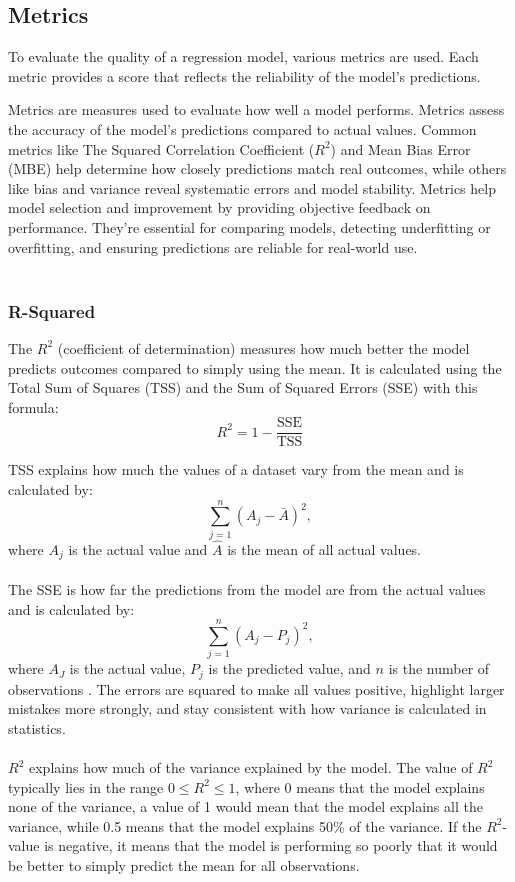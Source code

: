 \subsection{Metrics}
To evaluate the quality of a regression model, various metrics are used. Each metric provides a score that reflects the reliability of the model's predictions.

Metrics are measures used to evaluate how well a model performs. Metrics assess the accuracy of the model’s predictions compared to actual values. Common metrics like The Squared Correlation Coefficient ($R^{2}$) and Mean Bias Error (MBE) help determine how closely predictions match real outcomes, while others like bias and variance reveal systematic errors and model stability. Metrics help model selection and improvement by providing objective feedback on performance. They’re essential for comparing models, detecting underfitting or overfitting, and ensuring predictions are reliable for real-world use.
\\\\

\subsubsection{R-Squared}
The $R^2$ (coefficient of determination) measures how much better the model predicts outcomes compared to simply using the mean. It is calculated using the Total Sum of Squares (TSS) and the Sum of Squared Errors (SSE) with this formula: 
\begin{equation}
R^2=1-\frac{\text{SSE}}{\text{TSS}}
\end{equation}

TSS explains how much the values of a dataset vary from the mean and is calculated by: 
\begin{equation}
\sum_{j=1}^{n}(A_j - \bar{A})^2,
\end{equation}
where $A_j$ is the actual value and $\hat{A}$ is the mean of all actual values.
\\\\

\noindent The SSE is how far the predictions from the model are from the actual values and is calculated by:
\begin{equation}
	\sum_{j=1}^{n}(A_j - P_j)^2,
\end{equation}
where $A_J$ is the actual value, $P_j$ is the predicted value, and $n$ is the number of observations \cite{metrics}. The errors are squared to make all values positive, highlight larger mistakes more strongly, and stay consistent with how variance is calculated in statistics.
\\\\
$R^2$ explains how much of the variance explained by the model. The value of $R^2$ typically lies in the range $0 \leq R^2 \leq 1$, where 0 means that the model explains none of the variance, a value of 1 would mean that the model explains all the variance, while 0.5 means that the model explains 50\% of the variance. If the $R^2$-value is negative, it means that the model is performing so poorly that it would be better to simply predict the mean for all observations.

